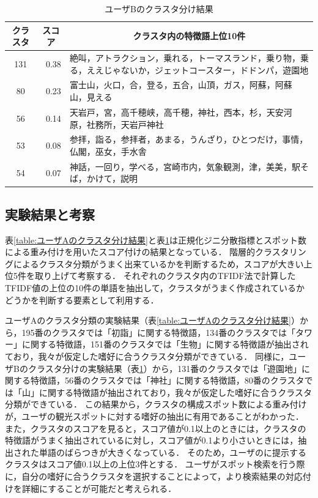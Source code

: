 \documentclass{deimj}
\begin{document}
\begin{table}[t]
    \caption{ユーザBのクラスタ分け結果}
    \label{table:ユーザBのクラスタ分け結果}
    \centering
    \begin{tabular}{c|r|l}
    \hline
    \multicolumn{1}{c|}{クラスタ} & \multicolumn{1}{c|}{スコア} & \multicolumn{1}{c}{クラスタ内の特徴語上位10件}                       \\ \hline
    131                       & 0.38                     & 絶叫，アトラクション，乗れる，トーマスランド，乗り物，乗る，ええじゃないか，ジェットコースター，ドドンパ，遊園地 \\
    80                        & 0.23                     & 富士山，火口，合，登る，五合，山頂，ガス，阿蘇，阿蘇山，見える                          \\
    56                        & 0.14                     & 天岩戸，宮，高千穂峡，高千穂，神社，西本，杉，天安河原，社務所，天岩戸神社                    \\
    53                        & 0.08                     & 参拝，詣る，参拝者，あまる，うんざり，ひとつだけ，事情，仏閣，巫女，手水舎                    \\
    54                        & 0.07                     & 神話，一回り，学べる，宮崎市内，気象観測，津，美美，駅そば，かけて，説明                     \\ \hline
    \end{tabular}
\end{table}

\subsection{実験結果と考察}
表\ref{table:ユーザAのクラスタ分け結果}と表\ref{table:ユーザBのクラスタ分け結果}は正規化ジニ分散指標とスポット数による重み付けを用いたスコア付けの結果となっている．
階層的クラスタリングによるクラスタ分類がうまく出来ているかを判断するため，スコアが大きい上位5件を取り上げて考察する．
それぞれのクラスタ内のTFIDF法で計算したTFIDF値の上位の10件の単語を抽出して，クラスタがうまく作成されているかどうかを判断する要素として利用する．

ユーザAのクラスタ分類の実験結果（表\ref{table:ユーザAのクラスタ分け結果}）から，195番のクラスタでは「初詣」に関する特徴語，134番のクラスタでは「タワー」に関する特徴語，151番のクラスタでは「生物」に関する特徴語が抽出されており，我々が仮定した嗜好に合うクラスタ分類ができている．
同様に，ユーザBのクラスタ分けの実験結果（表\ref{table:ユーザBのクラスタ分け結果}）から，131番のクラスタでは「遊園地」に関する特徴語，56番のクラスタでは「神社」に関する特徴語，80番のクラスタでは「山」に関する特徴語が抽出されており，我々が仮定した嗜好に合うクラスタ分類ができている．
この結果から，クラスタの構成スポット数による重み付けが，ユーザの観光スポットに対する嗜好の抽出に有用であることがわかった．
また，クラスタのスコアを見ると，スコア値が0.1以上のときには，クラスタの特徴語がうまく抽出されているに対し，スコア値が0.1より小さいときには，抽出された単語のばらつきが大きくなっている．
そのため，ユーザのに提示するクラスタはスコア値0.1以上の上位3件とする．
ユーザがスポット検索を行う際に，自分の嗜好に合うクラスタを選択することによって，より検索結果の対応付けを詳細にすることが可能だと考えられる．
\end{document}
